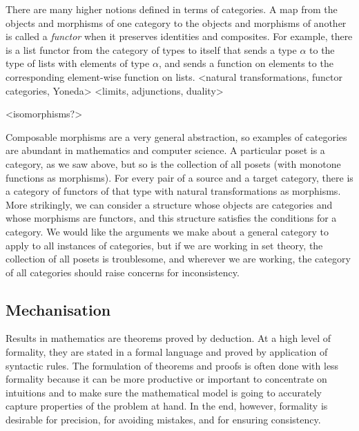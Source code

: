 \documentclass[twoside,titlepage,11pt]{article}
\begin{document}
There are many higher notions defined in terms of categories.
A map from the objects and morphisms of one category to the objects and morphisms of another is called a \emph{functor} when it preserves identities and composites.
For example, there is a list functor from the category of types to itself that sends a type $\alpha$ to the type of lists with elements of type $\alpha$, and sends a function on elements to the corresponding element-wise function on lists.
<natural transformations, functor categories, Yoneda>
<limits, adjunctions, duality>%

<isomorphisms?>

Composable morphisms are a very general abstraction, so examples of categories are abundant in mathematics and computer science.
A particular poset is a category, as we saw above, but so is the collection of all posets (with monotone functions as morphisms).
For every pair of a source and a target category, there is a category of functors of that type with natural transformations as morphisms.
More strikingly, we can consider a structure whose objects are categories and whose morphisms are functors, and this structure satisfies the conditions for a category.
We would like the arguments we make about a general category to apply to all instances of categories, but if we are working in set theory, the collection of all posets is troublesome, and wherever we are working, the category of all categories should raise concerns for inconsistency.%
\subsection{Mechanisation}%
Results in mathematics are theorems proved by deduction.
At a high level of formality, they are stated in a formal language and proved by application of syntactic rules.
The formulation of theorems and proofs is often done with less formality because it can be more productive or important to concentrate on intuitions and to make sure the mathematical model is going to accurately capture properties of the problem at hand.
In the end, however, formality is desirable for precision, for avoiding mistakes, and for ensuring consistency.%
\end{document}
